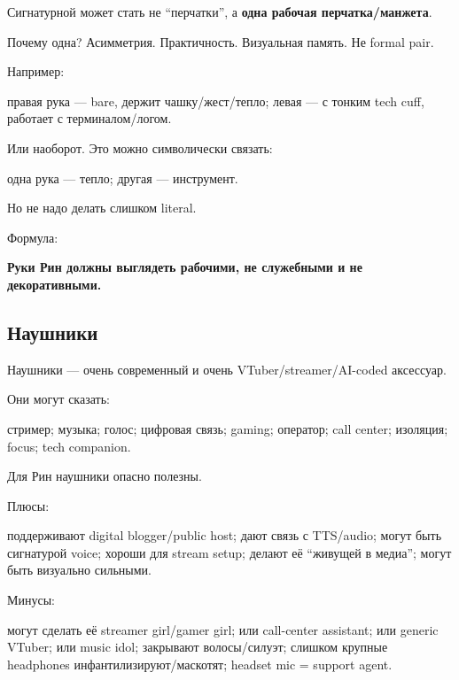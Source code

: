 Сигнатурной может стать не ``перчатки'', а \textbf{одна рабочая
перчатка/\hspace{0pt}манжета}.

Почему одна? Асимметрия. Практичность. Визуальная память. Не formal
pair.

Например:

правая рука --- bare, держит чашку/\hspace{0pt}жест/\hspace{0pt}тепло; левая --- с тонким tech
cuff, работает с терминалом/\hspace{0pt}логом.

Или наоборот. Это можно символически связать:

одна рука --- тепло; другая --- инструмент.

Но не надо делать слишком literal.

Формула:

\textbf{Руки Рин должны выглядеть рабочими, не служебными и не
декоративными.}

\subsection*{Наушники}

Наушники --- очень современный и очень VTuber/\hspace{0pt}streamer/\hspace{0pt}AI-coded
аксессуар.

Они могут сказать:

стример; музыка; голос; цифровая связь; gaming; оператор; call center;
изоляция; focus; tech companion.

Для Рин наушники опасно полезны.

Плюсы:

поддерживают digital blogger/\hspace{0pt}public host; дают связь с TTS/\hspace{0pt}audio; могут
быть сигнатурой voice; хороши для stream setup; делают её ``живущей в
медиа''; могут быть визуально сильными.

Минусы:

могут сделать её streamer girl/\hspace{0pt}gamer girl; или call-center assistant;
или generic VTuber; или music idol; закрывают волосы/\hspace{0pt}силуэт; слишком
крупные headphones инфантилизируют/\hspace{0pt}маскотят; headset mic = support
agent.

